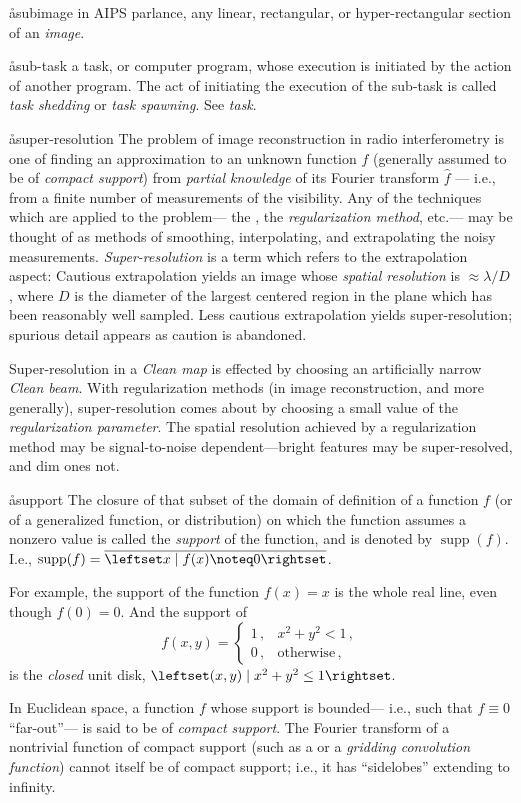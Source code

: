 \aa{subimage}
in AIPS parlance, any linear, rectangular, or hyper-rectangular
section of an {\it image}.

\aa{sub-task}
a task, or computer program, whose execution is initiated by
the action of another program.
The act of initiating the execution of the sub-task is called
{\it task shedding} or {\it task spawning}.
See {\it task}.

\aa{super-resolution}
The problem of image reconstruction in radio interferometry
is one of finding an approximation to
an unknown function $f$ (generally assumed to be of {\it compact
support}\/) from {\sl partial knowledge} of its
Fourier transform $\hat f$ --- i.e., from a finite number of
measurements of the visibility.
Any of the techniques which are applied to the problem---%
the \hca\/, the {\it regularization method}\/, etc.---%
may be thought of as methods of smoothing, interpolating, and
extrapolating the noisy measurements.
{\it Super-resolution} is a term which refers to the extrapolation
aspect:
Cautious extrapolation yields an image whose {\it spatial resolution}
is $\approx\lambda/D$, where $D$ is the diameter of the largest
centered region in the \uv plane which has been reasonably well sampled.
Less cautious extrapolation yields super-resolution;
spurious detail appears as caution is abandoned.
\par
Super-resolution in a {\it Clean map} is effected by choosing
an artificially narrow {\it Clean beam}.
With regularization methods (in image reconstruction, and more generally),
super-resolution comes about
by choosing a small value of the {\it regularization parameter}.
The spatial resolution achieved by a regularization method
may be signal-to-noise dependent---bright features may be
super-resolved, and dim ones not.

\aa{support}
The closure of that subset of the domain of definition of a function $f$
(or of a generalized function, or distribution)
on which the function assumes a nonzero value is called the
{\it support} of the function, and is denoted by $\operatorname{supp}(f)$.
I.e., $\operatorname{supp}(f)=\overline{\leftset x\mid f(x)\noteq0\rightset}$.
\par
For example, the support of the function $f(x)=x$ is the
whole real line, even though $f(0)=0$.
And the support of
$$f(x,y)=\left\{ \begin{array}{ll}
1\,,&x^2+y^2<1\,,\\0\,,&\text{otherwise}\,,
\end{array}\right.$$
is the {\it closed} unit disk, $\leftset(x,y)\mid x^2+y^2\le1\rightset$.
\par
In Euclidean space, a function $f$ whose support is bounded---%
i.e., such that $f\equiv0$ ``far-out''---%
is said to be of {\it compact support}.
The Fourier transform of a nontrivial function of compact support
(such as a 
or a {\it gridding convolution function}\/)
cannot itself be of compact support;
i.e., it has ``sidelobes'' extending to infinity.

